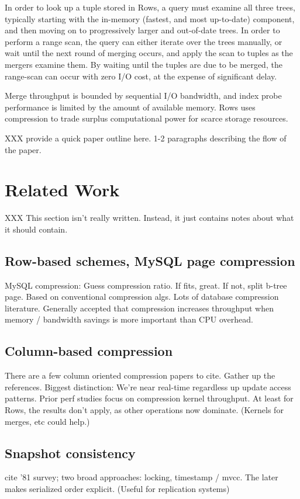 \documentclass{sig-alternate-sigmod08}
\newcommand{\rows}{Rows\xspace}
\begin{document}
In order to look up a tuple stored in \rows, a query must examine all
three trees, typically starting with the in-memory (fastest, and most
up-to-date) component, and then moving on to progressively larger and
out-of-date trees.  In order to perform a range scan, the query can
either iterate over the trees manually, or wait until the next round
of merging occurs, and apply the scan to tuples as the mergers examine
them.  By waiting until the tuples are due to be merged, the
range-scan can occur with zero I/O cost, at the expense of significant
delay.

Merge throughput is bounded by sequential I/O bandwidth, and index
probe performance is limited by the amount of available memory.  \rows
uses compression to trade surplus computational power for scarce
storage resources.

XXX provide a quick paper outline here.  1-2 paragraphs describing the flow of the paper.

\section{Related Work}

XXX This section isn't really written.  Instead, it just contains
notes about what it should contain.

\subsection{Row-based schemes, MySQL page compression}

MySQL compression: Guess compression ratio.  If fits, great.  If not,
split b-tree page.  Based on conventional compression algs.  Lots of
database compression literature.  Generally accepted that compression
increases throughput when memory / bandwidth savings is more important than
CPU overhead.

\subsection{Column-based compression}
There are a few column oriented compression papers to cite.  Gather up
the references.  Biggest distinction: We're near real-time regardless
up update access patterns.  Prior perf studies focus on compression
kernel throughput.  At least for \rows, the results don't apply, as
other operations now dominate.   (Kernels for merges, etc could help.)

\subsection{Snapshot consistency}
cite '81 survey; two broad approaches: locking, timestamp / mvcc.  The
later makes serialized order explicit.  (Useful for replication
systems)
\end{document}

